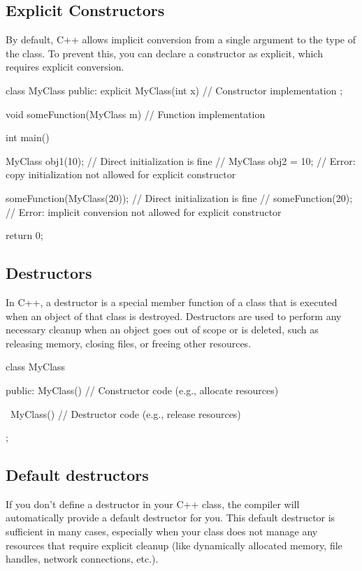 \documentclass{report}
\begin{document}
    \bigbreak \noindent 
    \subsection{Explicit Constructors}
    \bigbreak \noindent 
    \begin{concept}
         By default, C++ allows implicit conversion from a single argument to the type of the class. To prevent this, you can declare a constructor as explicit, which requires explicit conversion.
    \end{concept}
    \bigbreak \noindent 
    \begin{cppcode}
class MyClass {
public:
    explicit MyClass(int x) {
        // Constructor implementation
    }
};

void someFunction(MyClass m) {
    // Function implementation
}

int main() {
    MyClass obj1(10); // Direct initialization is fine
    // MyClass obj2 = 10; // Error: copy initialization not allowed for explicit constructor

    someFunction(MyClass(20)); // Direct initialization is fine
    // someFunction(20); // Error: implicit conversion not allowed for explicit constructor

    return 0;
}   \end{cppcode}
    

    \pagebreak
    \subsection{Destructors}
    \bigbreak \noindent 
    \begin{concept}
        In C++, a destructor is a special member function of a class that is executed when an object of that class is destroyed. Destructors are used to perform any necessary cleanup when an object goes out of scope or is deleted, such as releasing memory, closing files, or freeing other resources.
    \end{concept}
    \bigbreak \noindent 
    \begin{cppcode}
class MyClass {
public:
    MyClass() {
        // Constructor code (e.g., allocate resources)
    }

    ~MyClass() {
        // Destructor code (e.g., release resources)
    }
};
    \end{cppcode}

    \bigbreak \noindent 
    \subsection{Default destructors}
    \bigbreak \noindent 
    \begin{concept}
        If you don't define a destructor in your C++ class, the compiler will automatically provide a default destructor for you. This default destructor is sufficient in many cases, especially when your class does not manage any resources that require explicit cleanup (like dynamically allocated memory, file handles, network connections, etc.).
    \end{concept}
    
\end{document}
